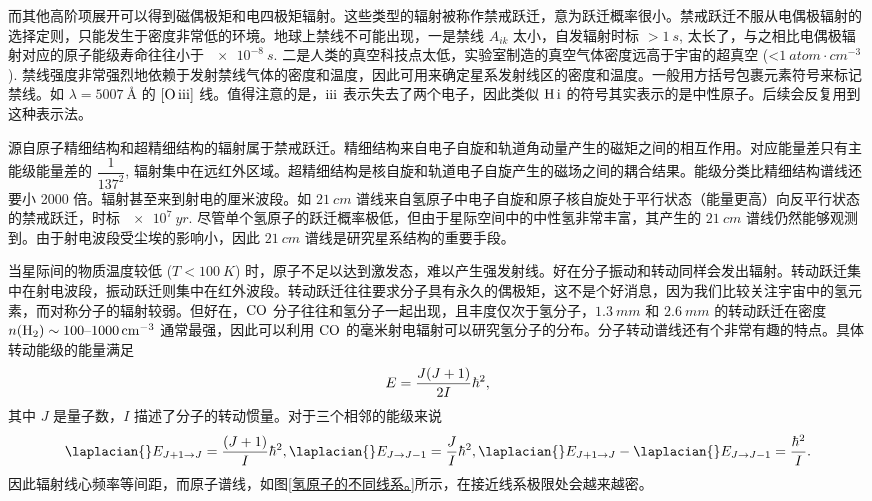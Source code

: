 \documentclass[../天体物理基础.tex]{subfiles}
\begin{document}
而其他高阶项展开可以得到磁偶极矩和电四极矩辐射。这些类型的辐射被称作禁戒跃迁，意为跃迁概率很小。禁戒跃迁不服从电偶极辐射的选择定则，只能发生于密度非常低的环境。地球上禁线不可能出现，一是禁线 $A_{ik}$ 太小，自发辐射时标 $>\qty{1}{s}$, 太长了，与之相比电偶极辐射对应的原子能级寿命往往小于 $\qty{e-8}{s}$. 二是人类的真空科技点太低，实验室制造的真空气体密度远高于宇宙的超真空 (<$\qty{1}{atom\cdot cm^{-3}}$). 禁线强度非常强烈地依赖于发射禁线气体的密度和温度，因此可用来确定星系发射线区的密度和温度。一般用方括号包裹元素符号来标记禁线。如 $\lambda=\qty{5007}{\angstrom}$ 的 $\mleft[\ce{O}\,\mathrm{\uppercase\expandafter{\romannumeral3}}\mright]$ 线。值得注意的是，$\mathrm{\uppercase\expandafter{\romannumeral3}}$ 表示失去了两个电子，因此类似 $\ce{H}\,\mathrm{\uppercase\expandafter{\romannumeral1}}$ 的符号其实表示的是中性原子。后续会反复用到这种表示法。

源自原子精细结构和超精细结构的辐射属于禁戒跃迁。精细结构来自电子自旋和轨道角动量产生的磁矩之间的相互作用。对应能量差只有主能级能量差的 $\dfrac{1}{137^{2}}$, 辐射集中在远红外区域。超精细结构是核自旋和轨道电子自旋产生的磁场之间的耦合结果。能级分类比精细结构谱线还要小 2000 倍。辐射甚至来到射电的厘米波段。如 $\qty{21}{cm}$ 谱线来自氢原子中电子自旋和原子核自旋处于平行状态（能量更高）向反平行状态的禁戒跃迁，时标 $\qty{e7}{yr}$. 尽管单个氢原子的跃迁概率极低，但由于星际空间中的中性氢非常丰富，其产生的 $\qty{21}{cm}$ 谱线仍然能够观测到。由于射电波段受尘埃的影响小，因此 $\qty{21}{cm}$ 谱线是研究星系结构的重要手段。

当星际间的物质温度较低 ($T<\qty{100}{K}$) 时，原子不足以达到激发态，难以产生强发射线。好在分子振动和转动同样会发出辐射。转动跃迁集中在射电波段，振动跃迁则集中在红外波段。转动跃迁往往要求分子具有永久的偶极矩，这不是个好消息，因为我们比较关注宇宙中的氢元素，而对称分子的辐射较弱。但好在，$\ce{CO}$ 分子往往和氢分子一起出现，且丰度仅次于氢分子，$\qty{1.3}{mm}$ 和 $\qty{2.6}{mm}$ 的转动跃迁在密度 $n\mleft(\ce{^{}H2}\mright)\sim100\text{\textendash}\qty{1000}{cm^{-3}}$ 通常最强，因此可以利用 $\ce{CO}$ 的毫米射电辐射可以研究氢分子的分布。分子转动谱线还有个非常有趣的特点。具体转动能级的能量满足
\begin{equation}
E=\frac{J\mleft(J+1\mright)}{2I}\hbar^{2},
\end{equation}
其中 $J$ 是量子数，$I$ 描述了分子的转动惯量。对于三个相邻的能级来说
\begin{equation}
\laplacian{}E_{J+1\to J}=\frac{\mleft(J+1\mright)}{I}\hbar^{2},\laplacian{}E_{J\to J-1}=\frac{J}{I}\hbar^{2},\laplacian{}E_{J+1\to J}-\laplacian{}E_{J\to J-1}=\frac{\hbar^{2}}{I}.
\end{equation}
因此辐射线心频率等间距，而原子谱线，如图\ref{氢原子的不同线系。}所示，在接近线系极限处会越来越密。
\end{document}
